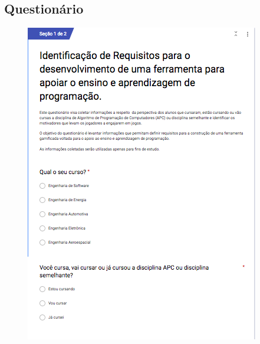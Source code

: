 \begin{apendicesenv}

\partapendices

\chapter{Questionário}
\label{apendicea}


\begin{figure}[h]
	\centering
	\includegraphics[keepaspectratio=true,scale=0.9]{figuras/q1.png}
\end{figure}


\end{apendicesenv}
